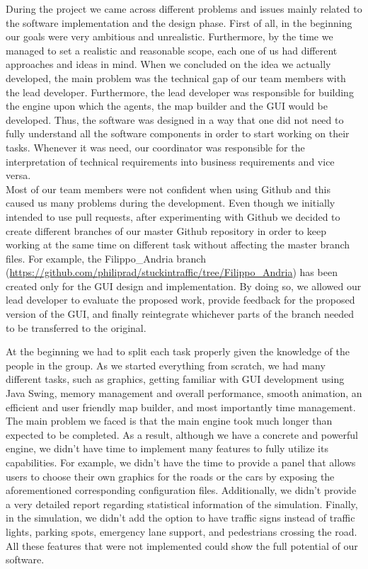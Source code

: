 \documentclass[oneside]{article}
\begin{document}
\noindent During the project we came across different problems and issues mainly related to the software implementation and the design phase. First of all, in the beginning our goals were very ambitious and unrealistic. Furthermore, by the time we managed to set a realistic and reasonable scope, each one of us had different approaches and ideas in mind. When we concluded on the idea we actually developed, the main problem was the technical gap of our team members with the lead developer. Furthermore, the lead developer was responsible for building the engine upon which the agents, the map builder and the GUI would be developed. Thus, the software was designed in a way that one did not need to fully understand all the software components in order to start working on their tasks. Whenever it was need, our coordinator was responsible for the interpretation of technical requirements into business requirements and vice versa.\\

\noindent Most of our team members were not confident when using Github and this caused us many problems during the development. Even though we initially intended to use pull requests, after experimenting with Github we decided to create different branches of our master Github repository in order to keep working at the same time on different task without affecting the master branch files. For example, the Filippo\_Andria branch (\url{https://github.com/philiprad/stuckintraffic/tree/Filippo_Andria}) has been created only for the GUI design and implementation. By doing so, we allowed our lead developer to evaluate the proposed work, provide feedback for the proposed version of the GUI, and finally reintegrate whichever parts of the branch needed to be transferred to the original. 
\newline

\noindent At the beginning we had to split each task properly given the knowledge of the people in the group. As we started everything from scratch, we had many different tasks, such as graphics, getting familiar with GUI development using Java Swing, memory management and overall performance, smooth animation, an efficient and user friendly map builder, and most importantly time management. The main problem we faced is that the main engine took much longer than expected to be completed. As a result, although we have a concrete and powerful engine, we didn't have time to implement many features to fully utilize its capabilities. For example, we didn't have the time to provide a panel that allows users to choose their own graphics for the roads or the cars by exposing the aforementioned corresponding configuration files. Additionally, we didn't provide a very detailed report regarding statistical information of the simulation. Finally, in the simulation, we didn't add the option to have traffic signs instead of traffic lights, parking spots, emergency lane support, and pedestrians crossing the road. All these features that were not implemented could show the full potential of our software.\\
\end{document}

